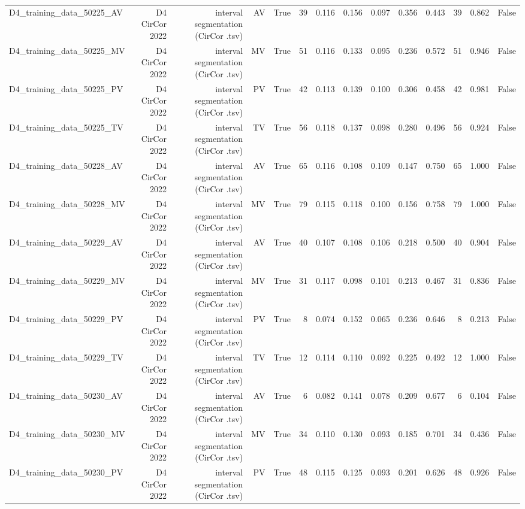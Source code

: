 \begin{table}[htbp]
\begin{tabular}{lrrrrrrrrrrrrr}
    D4\_training\_data\_50225\_AV & D4 CirCor 2022 & interval segmentation (CirCor .tsv) & AV & True & 39 & 0.116 & 0.156 & 0.097 & 0.356 & 0.443 & 39 & 0.862 & False \\
    D4\_training\_data\_50225\_MV & D4 CirCor 2022 & interval segmentation (CirCor .tsv) & MV & True & 51 & 0.116 & 0.133 & 0.095 & 0.236 & 0.572 & 51 & 0.946 & False \\
    D4\_training\_data\_50225\_PV & D4 CirCor 2022 & interval segmentation (CirCor .tsv) & PV & True & 42 & 0.113 & 0.139 & 0.100 & 0.306 & 0.458 & 42 & 0.981 & False \\
    D4\_training\_data\_50225\_TV & D4 CirCor 2022 & interval segmentation (CirCor .tsv) & TV & True & 56 & 0.118 & 0.137 & 0.098 & 0.280 & 0.496 & 56 & 0.924 & False \\
    D4\_training\_data\_50228\_AV & D4 CirCor 2022 & interval segmentation (CirCor .tsv) & AV & True & 65 & 0.116 & 0.108 & 0.109 & 0.147 & 0.750 & 65 & 1.000 & False \\
    D4\_training\_data\_50228\_MV & D4 CirCor 2022 & interval segmentation (CirCor .tsv) & MV & True & 79 & 0.115 & 0.118 & 0.100 & 0.156 & 0.758 & 79 & 1.000 & False \\
    D4\_training\_data\_50229\_AV & D4 CirCor 2022 & interval segmentation (CirCor .tsv) & AV & True & 40 & 0.107 & 0.108 & 0.106 & 0.218 & 0.500 & 40 & 0.904 & False \\
    D4\_training\_data\_50229\_MV & D4 CirCor 2022 & interval segmentation (CirCor .tsv) & MV & True & 31 & 0.117 & 0.098 & 0.101 & 0.213 & 0.467 & 31 & 0.836 & False \\
    D4\_training\_data\_50229\_PV & D4 CirCor 2022 & interval segmentation (CirCor .tsv) & PV & True & 8 & 0.074 & 0.152 & 0.065 & 0.236 & 0.646 & 8 & 0.213 & False \\
    D4\_training\_data\_50229\_TV & D4 CirCor 2022 & interval segmentation (CirCor .tsv) & TV & True & 12 & 0.114 & 0.110 & 0.092 & 0.225 & 0.492 & 12 & 1.000 & False \\
    D4\_training\_data\_50230\_AV & D4 CirCor 2022 & interval segmentation (CirCor .tsv) & AV & True & 6 & 0.082 & 0.141 & 0.078 & 0.209 & 0.677 & 6 & 0.104 & False \\
    D4\_training\_data\_50230\_MV & D4 CirCor 2022 & interval segmentation (CirCor .tsv) & MV & True & 34 & 0.110 & 0.130 & 0.093 & 0.185 & 0.701 & 34 & 0.436 & False \\
    D4\_training\_data\_50230\_PV & D4 CirCor 2022 & interval segmentation (CirCor .tsv) & PV & True & 48 & 0.115 & 0.125 & 0.093 & 0.201 & 0.626 & 48 & 0.926 & False \\

\end{tabular}
\end{table}
